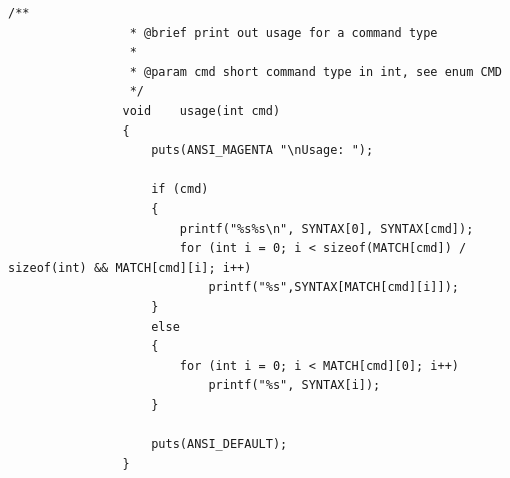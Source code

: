 \documentclass{article}
\begin{document}
\begin{Verbatim}[gobble=8]
                /**
                 * @brief print out usage for a command type
                 * 
                 * @param cmd short command type in int, see enum CMD
                 */
                void    usage(int cmd)
                {
                    puts(ANSI_MAGENTA "\nUsage: ");
                
                    if (cmd)
                    {
                        printf("%s%s\n", SYNTAX[0], SYNTAX[cmd]);
                        for (int i = 0; i < sizeof(MATCH[cmd]) / sizeof(int) && MATCH[cmd][i]; i++)
                            printf("%s",SYNTAX[MATCH[cmd][i]]);
                    }
                    else 
                    {
                        for (int i = 0; i < MATCH[cmd][0]; i++)
                            printf("%s", SYNTAX[i]);
                    }
                
                    puts(ANSI_DEFAULT);
                }                
            \end{Verbatim}
\end{document}
